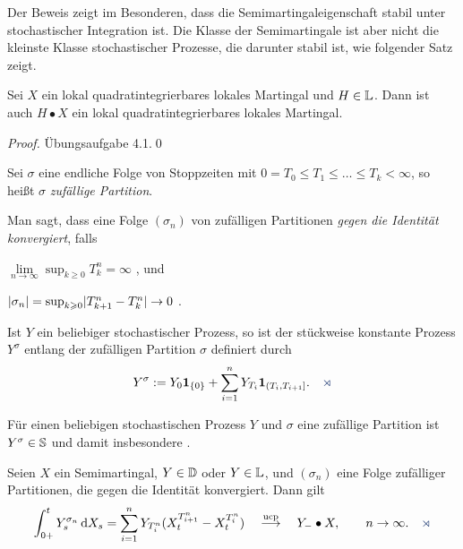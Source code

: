 Der Beweis zeigt im Besonderen, dass die Semimartingaleigenschaft stabil unter
stochastischer Integration ist. Die Klasse der Semimartingale ist aber nicht die
kleinste Klasse stochastischer Prozesse, die darunter stabil ist, wie
folgender Satz zeigt.

\begin{theorem}
\label{prop:2.14}
Sei $X$ ein lokal quadratintegrierbares lokales Martingal und
  $H\in \L$. Dann ist auch $H \bullet X$ ein lokal quadratintegrierbares lokales
  Martingal.\fish
\end{theorem}
\begin{proof}
Übungsaufgabe 4.1.\qed
\end{proof}

\begin{definition}
\label{defn:2.7}
\begin{defnenum}
\item Sei $\sigma$ eine endliche Folge von Stoppzeiten mit $0=T_0 \le T_1 \le
\ldots \le T_k < \infty$, so heißt $\sigma$ \emph{zufällige Partition}. 
\item
Man sagt, dass eine 
Folge $(\sigma_n)$ von zufälligen Partitionen \emph{gegen die Identität
konvergiert}, falls
\begin{equivenum}
\item $\lim\limits_{n\to\infty} \sup_{k\ge 0} T_k^n = \infty$ \fs, und
\item $\abs{\sigma_n} = \sup_{k\ge 0} \abs{T_{k+1}^n - T_k^n} \to 0$ \fs.\fish
\end{equivenum}
\item Ist $Y$ ein beliebiger stochastischer Prozess, so ist der stückweise
konstante Prozess \emph{$Y^\sigma$} entlang der zufälligen Partition $\sigma$
definiert durch
\begin{align*}
Y^\sigma \defl Y_0 \Id_{\setd{0}} + \sum_{i=1}^n
Y_{T_i}\Id_{(T_i,T_{i+1}]}.\fish
\end{align*} 
\end{defnenum}
\end{definition}

\begin{rem*}
Für einen beliebigen stochastischen Prozess $Y$ und $\sigma$ eine zufällige
Partition ist $Y^\sigma\in \S$ und damit insbesondere \caglad.\map
\end{rem*}

\begin{theorem}
\label{prop:2.15}
Seien $X$ ein Semimartingal, $Y\in \D$ oder $Y\in \L$, und
$(\sigma_n)$ eine Folge zufälliger Partitionen, die gegen die Identität
konvergiert. Dann gilt
\begin{align*}
\int_{0+}^t Y_s^{\sigma_n}\dX_s = \sum_{i=1}^n Y_{T_i^n} (X^{T_{i+1}^n}_t -
X^{T_i^n}_t) \quad\ucpto\quad Y_- \bullet X,\qquad n\to \infty.\fish
\end{align*}
\end{theorem}


